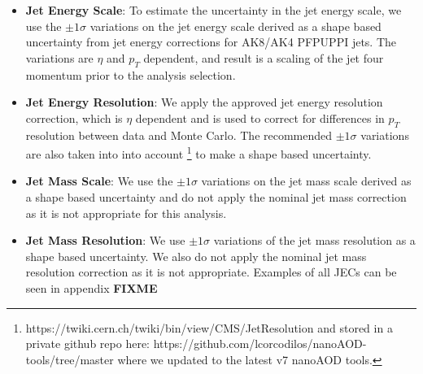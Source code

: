 \begin{itemize}


\item \textbf{Jet Energy Scale}: To estimate the uncertainty in the jet energy scale, we use the $\pm 1 \sigma$ variations on the jet energy scale derived as a shape based uncertainty from jet energy corrections for AK8/AK4 PFPUPPI jets. The variations are $\eta$ and $p_T$ dependent, and result is a scaling of the jet four momentum prior to the analysis selection.

\item \textbf{Jet Energy Resolution}: We apply the approved jet energy resolution correction, which is $\eta$ dependent and is used to correct for differences in $p_T$ resolution between data and Monte Carlo. The recommended $\pm 1 \sigma$ variations are also taken into into account \footnote{https://twiki.cern.ch/twiki/bin/view/CMS/JetResolution and stored in a private github repo here: https://github.com/lcorcodilos/nanoAOD-tools/tree/master where we updated to the latest v7 nanoAOD tools.} to make a shape based uncertainty. 

\item \textbf{Jet Mass Scale}: We use the $\pm 1 \sigma$ variations on the jet mass scale derived as a shape based uncertainty and do not apply the nominal jet mass correction as it is not appropriate for this analysis.

\item \textbf{Jet Mass Resolution}: We use $\pm 1 \sigma$ variations of the jet mass resolution as a shape based uncertainty. We also do not apply the nominal jet mass resolution correction as it is not appropriate. Examples of all JECs can be seen in appendix \textbf{FIXME} %


\end{itemize}
